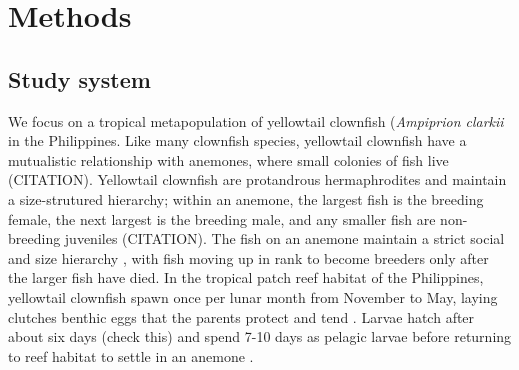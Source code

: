 \documentclass[12pt, oneside]{article}   	%
\begin{document}
\section*{Methods}  %

\subsection*{Study system}







We focus on a tropical metapopulation of yellowtail clownfish (\textit{Ampiprion clarkii} in the Philippines. Like many clownfish species, yellowtail clownfish have a mutualistic relationship with anemones, where small colonies of fish live (CITATION). Yellowtail clownfish are protandrous hermaphrodites and maintain a size-strutured hierarchy; within an anemone, the largest fish is the breeding female, the next largest is the breeding male, and any smaller fish are non-breeding juveniles (CITATION). The fish on an anemone maintain a strict social and size hierarchy \citep{buston2003social}, with fish moving up in rank to become breeders only after the larger fish have died. In the tropical patch reef habitat of the Philippines, yellowtail clownfish spawn once per lunar month from November to May, laying clutches benthic eggs that the parents protect and tend \citep{ochi1989mating}. Larvae hatch after about six days (check this) and spend 7-10 days as pelagic larvae before returning to reef habitat to settle in an anemone \citep{fautin1992field}.

\end{document}

